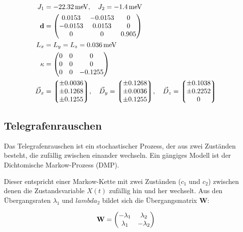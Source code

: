\documentclass[main.tex]{subfiles}
\begin{document}
\begin{align}
	J_1             & = \SI{-22,32}{\milli\electronvolt}, \quad J_2 =
	\SI{-1,4}{\milli\electronvolt}
	\\
	\mathbf{d}      & = \mqty(
	\num{0.0153}    & \num{-0.0153}                                   & 0
	\\
	\num{-0.0153}   & \num{0.0153}                                    & 0
	\\
	0               & 0                                               &
	\num{0.905})                                                          \\
	L_x             & = L_y = L_z = \SI{0.036}{\milli\electronvolt}
	\\
	\mathbf{\kappa} & = \mqty(
	0               & 0                                               & 0
	\\
	0               & 0                                               & 0
	\\
	0               & 0                                               &
	\num{-0.1255})                                                        \\
	\vec{D}_x       & = \mqty*(\num{\pm 0.0036}
	\\ \num{\pm 0.1268} \\ \num{\pm
		0.1255}), \quad
	\vec{D}_y = \mqty*(\num{\pm 0.1268}
	\\ \num{\pm 0.0036} \\ \num{\pm
		0.1255}), \quad
	\vec{D}_z = \mqty*(\num{\pm 0.1038}
	\\ \num{\pm 0.2252} \\ 0)
\end{align}
\subsection{Telegrafenrauschen}

Das Telegrafenrauschen ist ein stochastischer Prozess, der aus zwei Zuständen
besteht, die zufällig zwischen einander wechseln. Ein gängiges Modell ist der
Dichtomische Markow-Prozess (DMP).

Dieser entspricht einer Markow-Kette mit zwei Zuständen (\(c_1\) und \(c_2\))
zwischen denen die Zustandsvariable \(X(t)\) zufällig hin und her wechselt. Aus
den Übergangsraten \(\lambda_1\) und \(lambda_2\) bildet sich die
Übergangsmatrix \(\mathbf{W}\):

\begin{align}
	\mathbf{W} = \mqty(
	-\lambda_1 & \lambda_2   \\
	\lambda_1  & -\lambda_2)
\end{align}
\end{document}
